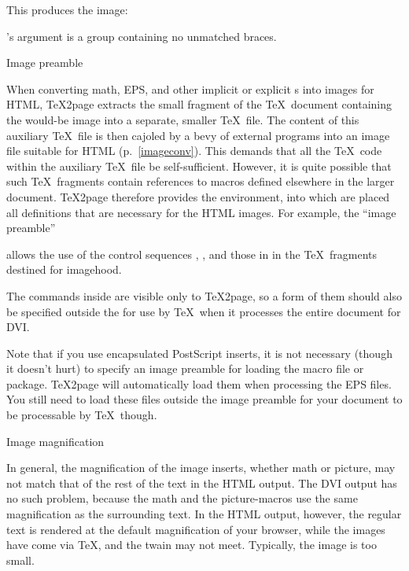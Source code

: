 {{{{{{{{{{{{{{

\n This produces the  image:

\smallskip

\smallskip

\n \p{\makehtmlimage}’s argument is a group containing
no unmatched braces.

\beginsection Image preamble

%
When converting math, EPS, and other implicit or
explicit \p{\htmlimage}s into images for HTML, \TeX2page
extracts the small fragment of the \TeX\ document
containing the would-be image into a separate, smaller
\TeX\ file.  The content of this auxiliary \TeX\ file is
then cajoled by a bevy of external programs into
an image file suitable for HTML (p.~\ref{imageconv}).  This demands that
all the \TeX\ code within the auxiliary \TeX\ file be
self-sufficient.  However, it is quite possible that
such \TeX\ fragments contain references to macros
defined elsewhere in the larger document.
\TeX2page therefore provides the \p{\imgpreamble}
 \p{\endimgpreamble} environment, into which
are placed all definitions that are necessary for
the HTML images.   For example, the “image preamble”


\n  allows the use of the control sequences \p{\gO},
\p{\I}, and those in  in the
\TeX\ fragments destined for imagehood.

The commands inside \p{\imgpreamble} are visible only
to \TeX2page, so a form of them should also be
specified outside the \p{\imgpreamble} for use by \TeX\
when it processes the entire document for DVI.

Note that if you use encapsulated PostScript inserts,
it is not necessary (though it doesn’t hurt) to
specify an image preamble for loading the 
macro file or  package.  \TeX2page will
automatically load them when processing the EPS files.
You still need to load these files outside the image
preamble for your document to be processable by \TeX\
though.

\beginsection Image magnification

%
In general, the magnification of the image
inserts, whether math or picture, may not match that
of the rest of the text in the HTML output.  The DVI
output has no such problem, because the math and
the picture-macros use the same magnification as the
surrounding text.  In the HTML output, however, the
regular text is rendered at the default magnification
of your browser, while the images have come via \TeX,
and the twain may not meet.  Typically, the image is
too small.

}}}}}}}}}}}}}}
